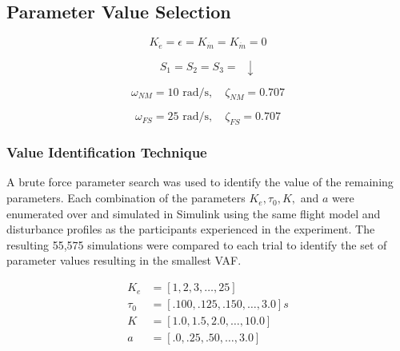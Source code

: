 \subsection{Parameter Value Selection}

\begin{equation}
    K_{\dot{e}} = \epsilon = K_{\dot{m}} = K_{\ddot{m}} = 0
\end{equation}

\begin{equation}
    S_1 = S_2 = S_3 = \enspace \downarrow
\end{equation}

\begin{equation}
    \omega_{NM} = 10 \mbox{ rad/s}, \quad \zeta_{NM} = 0.707
\end{equation}

\begin{equation}
    \omega_{FS} = 25 \mbox{ rad/s}, \quad \zeta_{FS} = 0.707
\end{equation}


\subsubsection{Value Identification Technique}
A brute force parameter search was used to identify the value of the remaining parameters.
Each combination of the parameters $K_e, \tau_0, K,$ and $a$ were enumerated over and simulated in Simulink using the same flight model and disturbance profiles as the participants experienced in the experiment.
The resulting 55,575 simulations were compared to each trial to identify the set of parameter values resulting in the smallest VAF.

\begin{align}
    K_e    & = [1, 2, 3, \ldots, 25]             \\
    \tau_0 & = [.100, .125, .150, \ldots, 3.0] s \\
    K      & = [1.0, 1.5, 2.0, \ldots, 10.0]     \\
    a      & = [.0, .25, .50, \ldots, 3.0]
\end{align}

